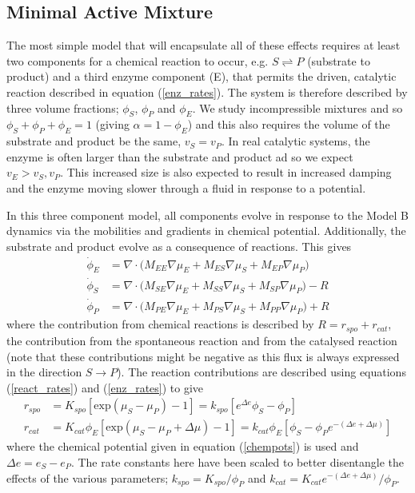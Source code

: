 \subsection{\label{sec:min_mix}Minimal Active Mixture}

The most simple model that will encapsulate all of these effects requires at least two components for a chemical reaction to occur, e.g. $S \rightleftharpoons P$ (substrate to product) and a third enzyme component (E), that permits the driven, catalytic reaction described in equation (\ref{enz_rates}). The system is therefore described by three volume fractions; $\phi_S$, $\phi_P$ and $\phi_E$. We study incompressible mixtures and so $\phi_S+\phi_P+\phi_E=1$ (giving $\alpha=1-\phi_E$) and this also requires the volume of the substrate and product be the same, $v_S=v_P$. In real catalytic systems, the enzyme is often larger than the substrate and product ad so we expect $v_E > v_S, v_P$\cite{berg_biochemistry_2002}. This increased size is also expected to result in increased damping and the enzyme moving slower through a fluid in response to a potential.

In this three component model, all components evolve in response to the Model B dynamics via the mobilities and gradients in chemical potential. Additionally, the substrate and product evolve as a consequence of reactions. This gives
\begin{align}
    \dot{\phi}_E &= \nabla \cdot \big(M_{EE}\nabla\mu_E + M_{ES}\nabla\mu_S + M_{EP}\nabla\mu_P) \label{evoE}\\
    \dot{\phi}_S &= \nabla \cdot \big(M_{SE}\nabla\mu_E + M_{SS}\nabla\mu_S + M_{SP}\nabla\mu_P) - R \label{evoS}\\
    \dot{\phi}_P &= \nabla \cdot \big(M_{PE}\nabla\mu_E + M_{PS}\nabla\mu_S + M_{PP}\nabla\mu_P) + R \label{evoP}
\end{align}
where the contribution from chemical reactions is described by $R = r_{spo} + r_{cat}$, the contribution from the spontaneous reaction and from the catalysed reaction (note that these contributions might be negative as this flux is always expressed in the direction $S \rightarrow P$). The reaction contributions are described using equations (\ref{react_rates}) and (\ref{enz_rates}) to give
\begin{align}
    r_{spo} &= K_{spo}[\text{exp}(\mu_S-\mu_P) - 1] = k_{spo}[e^{\Delta e}\phi_S - \phi_P] \\
    r_{cat} &= K_{cat}\phi_E[\text{exp}(\mu_S - \mu_P + \Delta\mu) - 1] = k_{cat}\phi_E[\phi_S-\phi_P e^{-(\Delta e+ \Delta\mu)}]
\end{align}
where the chemical potential given in equation (\ref{chempots}) is used and $\Delta e = e_S - e_P$. The rate constants here have been scaled to better disentangle the effects of the various parameters; $k_{spo} = K_{spo}/\phi_P$ and $k_{cat} = K_{cat}e^{-(\Delta e + \Delta \mu)}/\phi_P$.


